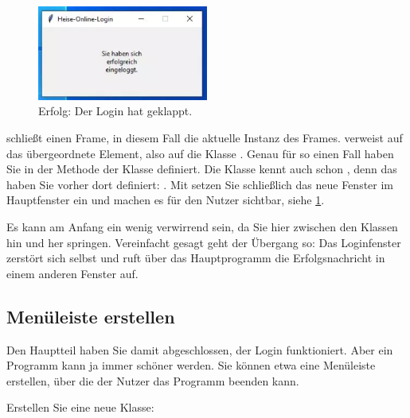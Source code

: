 \medskip


\begin{figure}
    \includegraphics[width=0.5\textwidth]{Images/TKinter/TkinterLoginOk}
    \caption{Erfolg: Der Login hat geklappt.} \label{TkinterLoginOk}
\end{figure}



 schließt einen Frame, in diesem Fall die aktuelle Instanz des Frames.  verweist auf das übergeordnete Element, also auf die Klasse . Genau für so einen Fall haben Sie in der Methode  der Klasse   definiert. Die Klasse  kennt auch schon , denn das haben Sie vorher dort definiert: . Mit  setzen Sie schließlich das neue Fenster  im Hauptfenster ein und machen es für den Nutzer sichtbar, siehe \ref{TkinterLoginOk}.

Es kann am Anfang ein wenig verwirrend sein, da Sie hier zwischen den Klassen hin und her springen. Vereinfacht gesagt geht der Übergang so: Das Loginfenster zerstört sich selbst und ruft über das Hauptprogramm die Erfolgsnachricht in einem anderen Fenster auf.


\subsection{Menüleiste erstellen}


Den Hauptteil haben Sie damit abgeschlossen, der Login funktioniert. Aber ein Programm kann ja immer schöner werden. Sie können etwa eine Menüleiste erstellen, über die der Nutzer das Programm beenden kann.

Erstellen Sie eine neue Klasse:

\medskip



